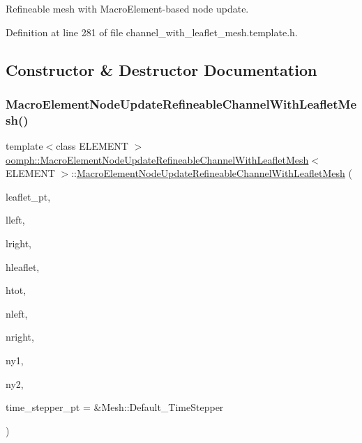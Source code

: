 Refineable mesh with Macro\+Element-\/based node update. 

Definition at line 281 of file channel\+\_\+with\+\_\+leaflet\+\_\+mesh.\+template.\+h.



\subsection{Constructor \& Destructor Documentation}
\mbox{\label{classoomph_1_1MacroElementNodeUpdateRefineableChannelWithLeafletMesh_aa15c165d7e755e4e885d895e16bb76b8}} 
\subsubsection{\texorpdfstring{Macro\+Element\+Node\+Update\+Refineable\+Channel\+With\+Leaflet\+Mesh()}{MacroElementNodeUpdateRefineableChannelWithLeafletMesh()}}
{\footnotesize\ttfamily template$<$class E\+L\+E\+M\+E\+NT $>$ \\
\hyperlink{classoomph_1_1MacroElementNodeUpdateRefineableChannelWithLeafletMesh}{oomph\+::\+Macro\+Element\+Node\+Update\+Refineable\+Channel\+With\+Leaflet\+Mesh}$<$ E\+L\+E\+M\+E\+NT $>$\+::\hyperlink{classoomph_1_1MacroElementNodeUpdateRefineableChannelWithLeafletMesh}{Macro\+Element\+Node\+Update\+Refineable\+Channel\+With\+Leaflet\+Mesh} (\begin{DoxyParamCaption}\item[{Geom\+Object $\ast$}]{leaflet\+\_\+pt,  }\item[{const double \&}]{lleft,  }\item[{const double \&}]{lright,  }\item[{const double \&}]{hleaflet,  }\item[{const double \&}]{htot,  }\item[{const unsigned \&}]{nleft,  }\item[{const unsigned \&}]{nright,  }\item[{const unsigned \&}]{ny1,  }\item[{const unsigned \&}]{ny2,  }\item[{Time\+Stepper $\ast$}]{time\+\_\+stepper\+\_\+pt = {\ttfamily \&Mesh\+:\+:Default\+\_\+TimeStepper} }\end{DoxyParamCaption})\hspace{0.3cm}{\ttfamily [inline]}}



